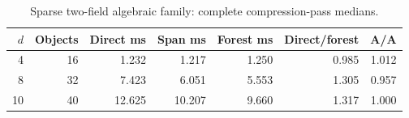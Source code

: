 \begin{table}[htbp]
\centering\small
\setlength{\tabcolsep}{4pt}
\begin{tabular}{@{}rrrrrrr@{}}
\toprule
$d$ & Objects & Direct ms & Span ms & Forest ms & Direct/forest & A/A\\\midrule
4 & 16 & 1.232 & 1.217 & 1.250 & 0.985 & 1.012\\
8 & 32 & 7.423 & 6.051 & 5.553 & 1.305 & 0.957\\
10 & 40 & 12.625 & 10.207 & 9.660 & 1.317 & 1.000\\
\bottomrule
\end{tabular}
\caption{Sparse two-field algebraic family: complete compression-pass medians.}
\label{tab:sparse}
\end{table}
